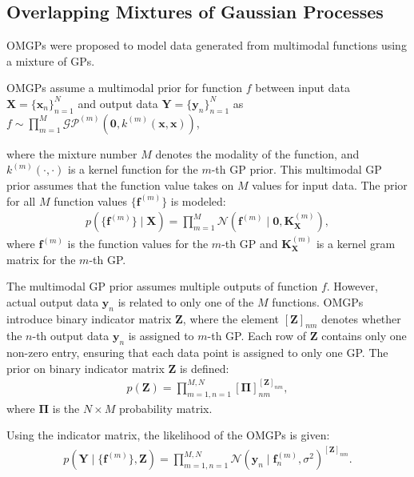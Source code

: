 \documentclass[sn-mathphys-num]{sn-jnl}
\begin{document}
\subsection{Overlapping Mixtures of Gaussian Processes}
OMGPs \cite{lazaro2012overlapping} were proposed to model data generated from multimodal functions using a mixture of GPs.

OMGPs assume a multimodal prior for function $f$ between input data $\mathbf X = \{\mathbf x_n\}_{n=1}^N$ and output data $\mathbf Y = \{\mathbf y_n\}_{n=1}^N$ as $f \sim \prod_{m=1}^M \mathcal{GP}^{(m)}(\mathbf{0}, k^{(m)}(\mathbf{x}, \mathbf{x}))$,

where the mixture number $M$ denotes the modality of the function, and $k^{(m)}(\cdot, \cdot)$ is a kernel function for the $m$-th GP prior.
This multimodal GP prior assumes that the function value takes on $M$ values for input data.
The prior for all $M$ function values $\{\mathbf{f}^{(m)}\}$ is modeled:
\begin{align}
    p(\{\mathbf{f}^{(m)}\} \mid \mathbf{X})=\prod_{m=1}^M \mathcal{N}(\mathbf{f}^{(m)} \mid \mathbf{0}, \mathbf{K}_{\mathbf{X}}^{(m)}),
\end{align}
where $\mathbf{f}^{(m)}$ is the function values for the $m$-th GP and $\mathbf{K}_{\mathbf{X}}^{(m)}$ is a kernel gram matrix for the $m$-th GP.

The multimodal GP prior assumes multiple outputs of function $f$.
However, actual output data $\mathbf y_n$ is related to only one of the $M$ functions.
OMGPs introduce binary indicator matrix $\mathbf{Z}$, where the element $\left[\mathbf{Z}\right]_{nm}$ denotes whether the $n$-th output data $\mathbf{y}_n$ is assigned to $m$-th GP.
Each row of $\mathbf{Z}$ contains only one non-zero entry, ensuring that each data point is assigned to only one GP.
The prior on binary indicator matrix $\mathbf{Z}$ is defined:
\begin{align}
    p(\mathbf{Z})=\prod_{m=1,n=1}^{M, N}[\mathbf{\Pi}]_{nm}^{[\mathbf{Z}]_{nm}}, \label{eq:prior:indicator:matrix}
\end{align}
where $\mathbf{\Pi}$ is the $N \times M$ probability matrix.

Using the indicator matrix, the likelihood of the OMGPs is given:
\begin{align}
    p({\mathbf{Y}}\mid \{\mathbf{f}^{(m)}\}, \mathbf{Z}) = \prod_{m=1,n=1}^{M, N} \mathcal{N}(\mathbf{y}_n\mid \mathbf{f}^{(m)}_n, \sigma^2)^{[\mathbf{Z}]_{nm}}. \label{eq:likelihood:omgp}
\end{align}
\end{document}
